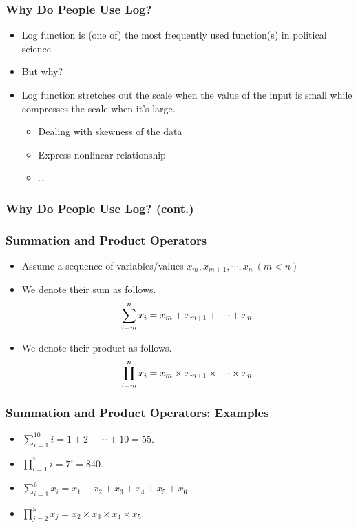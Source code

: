 \documentclass[pdflatex, 12pt]{beamer}
\begin{document}
\begin{frame}
\frametitle{Why Do People Use Log?}
\begin{itemize}
\item Log function is (one of) the most frequently used function(s) in political science.
\vspace{0.4cm}
\item But why?
\vspace{0.4cm}
\item Log function stretches out the scale when the value of the input is small while compresses the scale when it's large.
 \begin{itemize}
 \item Dealing with skewness of the data
 \item Express nonlinear relationship
 \item ...
 \end{itemize}
\end{itemize}
\end{frame}

\begin{frame}
\frametitle{Why Do People Use Log? (cont.)}
\centering
{}
\end{frame}

\begin{frame}
\frametitle{Summation and Product Operators}
\begin{itemize}
\item Assume a sequence of variables/values $x_m, x_{m + 1}, \cdots, x_n \ (m < n)$
\vspace{0.4cm}
\item We denote their sum as follows.
 \begin{equation}
 \sum_{i = m}^{n} x_i = x_m + x_{m + 1} + \cdots + x_n \notag
 \end{equation}
\item We denote their product as follows.
 \begin{equation}
 \prod_{i = m}^{n} x_i = x_m \times x_{m + 1} \times \cdots \times x_n \notag 
 \end{equation}
\end{itemize}
\end{frame}

\begin{frame}
\frametitle{Summation and Product Operators: Examples}
\begin{itemize}
\item $\sum_{i = 1}^{10} i = 1 + 2 + \cdots + 10 = 55.$
\vspace{0.4cm}
\item $\prod_{i = 1}^{7} i = 7! = 840.$
\vspace{0.4cm}
\item $\sum_{i = 1}^{6} x_i = x_1 + x_2 + x_3 + x_4 + x_5 + x_6.$
\vspace{0.4cm}
\item $\prod_{j = 2}^{5} x_j = x_2 \times x_3 \times x_4 \times x_5.$
\end{itemize}
\end{frame}
\end{document}
